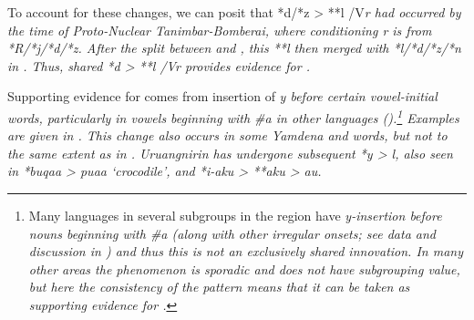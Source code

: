 To account for these changes,
we can posit that *d/*z > **l /{\gap}V\it{r} had occurred by
the time of Proto-Nuclear Tanimbar-Bomberai,
where conditioning \it{r} is from *R/*j/*d/*z.
After the split between 
and , this **l then merged with *l/*d/*z/*n in .
Thus, shared *d > **l /{\gap}V\it{r} provides evidence for .

Supporting evidence for  comes
from insertion of \it{y} before certain vowel-initial words,
particularly in vowels beginning with \it{{\#}a} in other languages ().\footnote{
		Many languages in several subgroups in the region have \it{y}-insertion
		before nouns beginning with \it{{\#}a} (along with other irregular
		onsets; see data and discussion in )
		and thus this is not an exclusively shared innovation.
		In many other areas the phenomenon is sporadic
		and does not have subgrouping value,
		but here the consistency of the pattern means that it can be
		taken as supporting evidence for .}
Examples are given in .
This change also occurs in some Yamdena
and  words,
but not to the same extent as in .
Uruangnirin has undergone subsequent *y > \it{l},
also seen in *buqaa > \it{puaa} ‘crocodile’,
and *i-aku > **aku > \it{au}.

